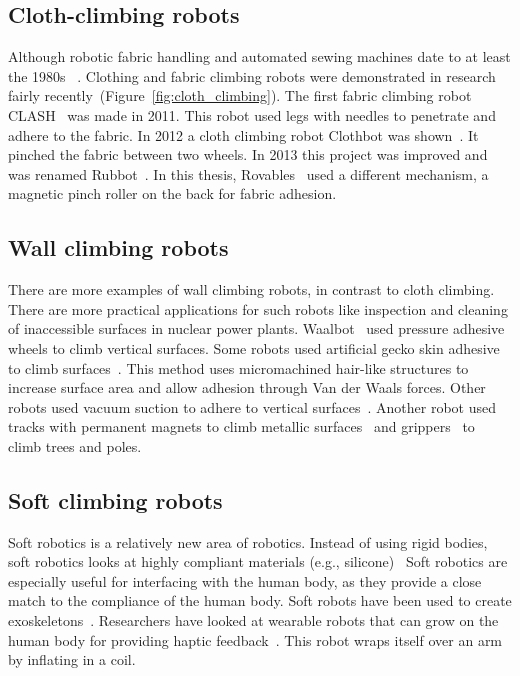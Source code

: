 \subsection{Cloth-climbing robots}
Although robotic fabric handling and automated sewing machines date to at least the 1980s ~\cite{briggs1988automated}. Clothing and fabric climbing robots were demonstrated in research fairly recently~(Figure~\ref{fig:cloth_climbing}). The first fabric climbing robot CLASH~\cite{birkmeyer2011clash} was made in 2011. This robot used legs with needles to penetrate and adhere to the fabric. In 2012 a cloth climbing robot Clothbot was shown~\cite{liu2012system,geng2018clothbot_beta}. It pinched the fabric between two wheels. In 2013 this project was improved and was renamed Rubbot~\cite{chen2013rubbot}. In this thesis, Rovables~\cite{dementyev2016rovables} used a different mechanism, a magnetic pinch roller on the back for fabric adhesion. 

\subsection{Wall climbing robots}
There are more examples of wall climbing robots, in contrast to cloth climbing. There are more practical applications for such robots like inspection and cleaning of inaccessible surfaces in nuclear power plants. Waalbot~\cite{murphy2007waalbot} used pressure adhesive wheels to climb vertical surfaces. Some robots used artificial gecko skin adhesive to climb surfaces~\cite{menon2004gecko}. This method uses micromachined hair-like structures to increase surface area and allow adhesion through Van der Waals forces. Other robots used vacuum suction to adhere to vertical surfaces~\cite{briones1994wall}. Another robot used tracks with permanent magnets to climb metallic surfaces~\cite{eich2011design} and grippers~\cite{lam2011flexible} to climb trees and poles. 

\subsection{Soft climbing robots}
Soft robotics is a relatively new area of robotics. Instead of using rigid bodies, soft robotics looks at highly compliant materials (e.g., silicone)~\cite{trivedi2008soft} Soft robotics are especially useful for interfacing with the human body, as they provide a close match to the compliance of the human body. Soft robots have been used to create exoskeletons~\cite{polygerinos2015soft,tsagarakis2003development}. Researchers have looked at wearable robots that can grow on the human body for providing haptic feedback~\cite{agharese2018hapwrap}. This robot wraps itself over an arm by inflating in a coil. 


